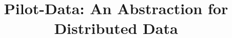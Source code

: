 \documentclass{sig-alternate}
\begin{document}

\title{Pilot-Data: An Abstraction for Distributed Data}

\end{document}
